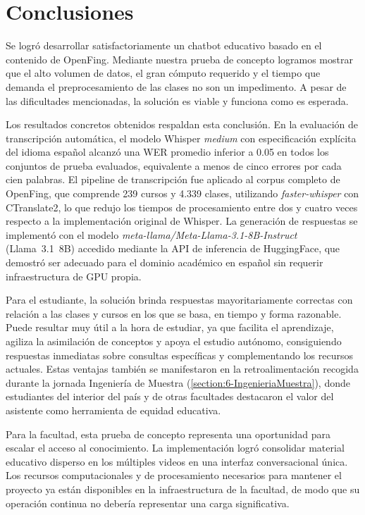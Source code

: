 \chapter{Conclusiones}
\label{chapter:7-Conclusiones}

Se logró desarrollar satisfactoriamente un chatbot educativo basado en el contenido de OpenFing. Mediante nuestra prueba de concepto logramos mostrar que el alto volumen de datos, el gran cómputo requerido y el tiempo que demanda el preprocesamiento de las clases no son un impedimento. A pesar de las dificultades mencionadas, la solución es viable y funciona como es esperada.

Los resultados concretos obtenidos respaldan esta conclusión. En la evaluación de transcripción automática, el modelo Whisper \textit{medium} con especificación explícita del idioma español alcanzó una WER promedio inferior a 0.05 en todos los conjuntos de prueba evaluados, equivalente a menos de cinco errores por cada cien palabras. El pipeline de transcripción fue aplicado al corpus completo de OpenFing, que comprende 239 cursos y 4.339 clases, utilizando \textit{faster-whisper} con CTranslate2, lo que redujo los tiempos de procesamiento entre dos y cuatro veces respecto a la implementación original de Whisper. La generación de respuestas se implementó con el modelo \textit{meta-llama/Meta-Llama-3.1-8B-Instruct} (Llama~3.1~8B) accedido mediante la API de inferencia de HuggingFace, que demostró ser adecuado para el dominio académico en español sin requerir infraestructura de GPU propia.

Para el estudiante, la solución brinda respuestas mayoritariamente correctas con relación a las clases y cursos en los que se basa, en tiempo y forma razonable. Puede resultar muy útil a la hora de estudiar, ya que facilita el aprendizaje, agiliza la asimilación de conceptos y apoya el estudio autónomo, consiguiendo respuestas inmediatas sobre consultas específicas y complementando los recursos actuales. Estas ventajas también se manifestaron en la retroalimentación recogida durante la jornada Ingeniería de Muestra (\autoref{section:6-IngenieriaMuestra}), donde estudiantes del interior del país y de otras facultades destacaron el valor del asistente como herramienta de equidad educativa.

Para la facultad, esta prueba de concepto representa una oportunidad para escalar el acceso al conocimiento. La implementación logró consolidar material educativo disperso en los múltiples videos en una interfaz conversacional única. Los recursos computacionales y de procesamiento necesarios para mantener el proyecto ya están disponibles en la infraestructura de la facultad, de modo que su operación continua no debería representar una carga significativa.

